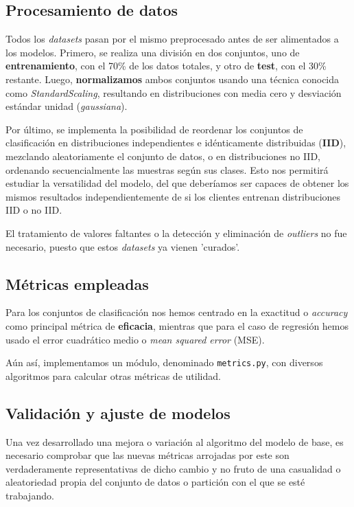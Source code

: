 \documentclass[00-Trabajo_Final.tex]{subfiles}
\begin{document}
\subsection*{Procesamiento de datos}
Todos los \textit{datasets} pasan por el mismo preprocesado antes de ser alimentados a los modelos. Primero, se realiza una división en dos conjuntos, uno de \textbf{entrenamiento}, con el 70\% de los datos totales, y otro de \textbf{test}, con el 30\% restante. Luego, \textbf{normalizamos} ambos conjuntos usando una técnica conocida como \textit{StandardScaling}, resultando en distribuciones con media cero y desviación estándar unidad (\textit{gaussiana}).

Por último, se implementa la posibilidad de reordenar los conjuntos de clasificación en distribuciones independientes e idénticamente distribuidas (\textbf{IID}), mezclando aleatoriamente el conjunto de datos, o en distribuciones no IID, ordenando secuencialmente las muestras según sus clases. Esto nos permitirá estudiar la versatilidad del modelo, del que deberíamos ser capaces de obtener los mismos resultados independientemente de si los clientes entrenan distribuciones IID o no IID.

El tratamiento de valores faltantes o la detección y eliminación de \textit{outliers} no fue necesario, puesto que estos \textit{datasets} ya vienen 'curados'.

\subsection*{Métricas empleadas}
Para los conjuntos de clasificación nos hemos centrado en la exactitud o \textit{accuracy} como principal métrica de \textbf{eficacia}, mientras que para el caso de regresión hemos usado el error cuadrático medio o \textit{mean squared error} (MSE).

Aún así, implementamos un módulo, denominado \verb|metrics.py|, con diversos algoritmos para calcular otras métricas de utilidad.

\subsection*{Validación y ajuste de modelos}
Una vez desarrollado una mejora o variación al algoritmo del modelo de base, es necesario comprobar que las nuevas métricas arrojadas por este son verdaderamente representativas de dicho cambio y no fruto de una casualidad o aleatoriedad propia del conjunto de datos o partición con el que se esté trabajando.
\end{document}

